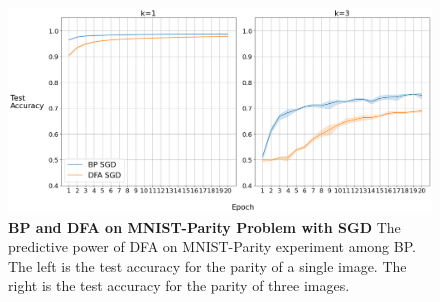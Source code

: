 \documentclass[a4paper, nobind]{templates/ociamthesis}
\begin{document}
\begin{figure}

{\centering \includegraphics[width=1\linewidth]{figures/3_k13_SGD_DFAvsBP} 

}

\caption[BP and DFA on MNIST-Parity Problem with SGD]{ \textbf{BP and DFA on MNIST-Parity Problem with SGD} \newline The predictive power of DFA on MNIST-Parity experiment among BP. The left is the test accuracy for the parity of a single image. The right is the test accuracy for the parity of three images.}\label{fig:BPvsDFA}
\end{figure}
\end{document}
